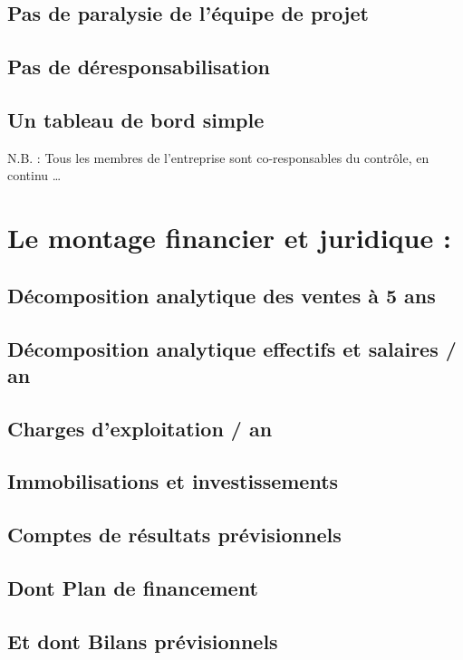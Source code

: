 	\subsection{Pas de paralysie de l’équipe de projet}
	\subsection{Pas de déresponsabilisation}
	\subsection{Un tableau de bord simple}
N.B. : Tous les membres de l'entreprise sont co-responsables du contrôle, en continu …

\section{Le montage financier et juridique :}
	\subsection{Décomposition analytique des ventes à 5 ans}
	\subsection{Décomposition analytique effectifs et salaires / an}
	\subsection{Charges d'exploitation / an}
	\subsection{Immobilisations et investissements}
	\subsection{Comptes de résultats prévisionnels}
	\subsection{Dont Plan de financement}
	\subsection{Et dont Bilans prévisionnels}
